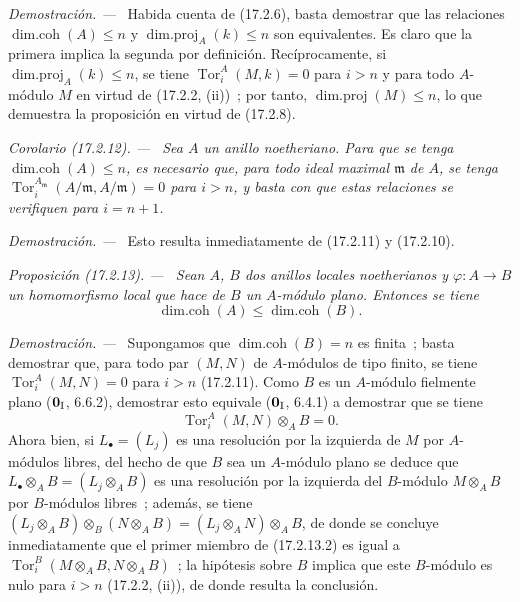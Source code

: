 \documentclass[10pt,oneside]{book}
\makeatletter
\newcommand{\setmanualcurrentlabel}[1]{\def\@currentlabel{#1}}
\newcommand{\oldpage}[2][]{%
  \setcounter{footnote}{0}%
  \marginpar{\scriptsize\textbf{#1}~|~#2}\ignorespaces}
\newenvironment{proposition}[1][]{%
  \setmanualcurrentlabel{#1}\par\medskip\noindent\itshape Proposición (#1). ---\ }{\par}
\newenvironment{corollary}[1][]{%
  \setmanualcurrentlabel{#1}\par\medskip\noindent\itshape Corolario (#1). ---\ }{\par}
\newenvironment{proof}{%
  \par\medskip\noindent\textit{Demostración. ---\ }}{\par}
\makeatother
\begin{document}
\begin{proof}
Habida cuenta de (17.2.6), basta demostrar que las relaciones
$\operatorname{dim.coh}(A)\leq n$ y
$\operatorname{dim.proj}_A(k)\leq n$ son equivalentes. Es claro que la
primera implica la segunda por definición. Recíprocamente, si
$\operatorname{dim.proj}_A(k)\leq n$, se tiene
$\operatorname{Tor}^A_i(M,k)=0$ para $i>n$ y para todo $A$-módulo $M$ en
virtud de (17.2.2, (ii))~; por tanto, $\operatorname{dim.proj}(M)\leq n$, lo que
demuestra la proposición en virtud de (17.2.8).
\end{proof}

\begin{corollary}[17.2.12]
\label{0.17.2.12-es}
Sea $A$ un anillo noetheriano. Para que se tenga
$\operatorname{dim.coh}(A)\leq n$, es necesario que, para todo ideal
maximal $\mathfrak{m}$ de $A$, se tenga
$\operatorname{Tor}^{A_{\mathfrak{m}}}_i(A/\mathfrak{m},A/\mathfrak{m})=0$
para $i>n$, y basta con que estas relaciones se verifiquen para $i=n+1$.
\end{corollary}

\begin{proof}
Esto resulta inmediatamente de (17.2.11) y (17.2.10).
\end{proof}

\begin{proposition}[17.2.13]
\label{0.17.2.13-es}
Sean $A$, $B$ dos anillos locales noetherianos y
$\varphi:A\longrightarrow B$ un homomorfismo local que hace de $B$ un
$A$-módulo plano. Entonces se tiene
\begin{equation}
\label{0.17.2.13.1-es}
\tag{17.2.13.1}
  \operatorname{dim.coh}(A)\leq\operatorname{dim.coh}(B).
\end{equation}
\end{proposition}

\begin{proof}
Supongamos que $\operatorname{dim.coh}(B)=n$ es finita~; basta demostrar
que, para todo par $(M,N)$ de $A$-módulos de tipo finito, se tiene
$\operatorname{Tor}^A_i(M,N)=0$ para $i>n$ (17.2.11). Como $B$ es un
$A$-módulo fielmente plano ($\mathbf 0_{\rm I}$, 6.6.2), demostrar esto equivale
($\mathbf{0}_{\rm I}$, 6.4.1) a demostrar que se tiene
\begin{equation}
\label{0.17.2.13.2-es}
\tag{17.2.13.2}
  \operatorname{Tor}^A_i(M,N)\otimes_A B=0.
\end{equation}
Ahora bien, si $L_\bullet=(L_j)$ es una resolución por la izquierda de $M$ por $A$-módulos
libres, del hecho de que $B$ sea un $A$-módulo plano se deduce que
$L_\bullet\otimes_A B=(L_j\otimes_A B)$ es una resolución por la izquierda del
$B$-módulo $M\otimes_A B$ por $B$-módulos libres~; además, se tiene
$(L_j\otimes_A B)\otimes_B(N\otimes_A B)
=(L_j\otimes_A N)\otimes_A B$, de donde se concluye inmediatamente que el primer miembro
\oldpage[0\textsubscript{IV-1}]{46}
de (17.2.13.2) es igual a
$\operatorname{Tor}^B_i(M\otimes_A B,N\otimes_A B)$~; la hipótesis sobre $B$
implica que este $B$-módulo es nulo para $i>n$ (17.2.2, (ii)), de donde resulta la
conclusión.
\end{proof}
\end{document}
